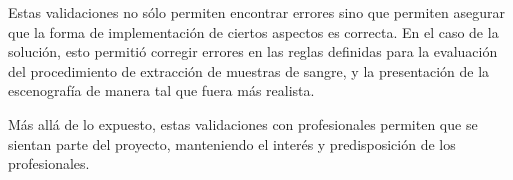 Estas validaciones no sólo permiten encontrar errores sino que permiten asegurar
que la forma de implementación de ciertos aspectos es correcta. En el caso de la
solución, esto permitió corregir errores en las reglas definidas para la
evaluación del procedimiento de extracción de muestras de sangre, y la
presentación de la escenografía de manera tal que fuera más realista.

Más allá de lo expuesto, estas validaciones con profesionales permiten que se
sientan parte del proyecto, manteniendo el interés y predisposición de los
profesionales.



    
